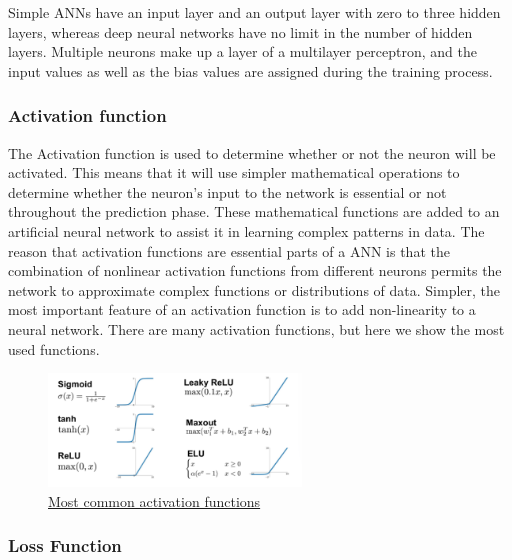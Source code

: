 Simple ANNs have an input layer and an output layer with zero to three hidden layers, whereas deep neural networks have no limit in the number of hidden layers. Multiple neurons make up a layer of a multilayer perceptron, and the input values as well as the bias values are assigned
during the training process.



\subsubsection*{Activation function}
The Activation function is used to determine whether or not the neuron will be activated. This means that it will use simpler mathematical operations to determine whether the neuron's input to the network is essential or not throughout the prediction phase. These mathematical functions are added to an artificial neural network to assist it in learning complex patterns in data. The reason that activation functions are essential parts of a ANN is that the combination of nonlinear activation functions from different neurons permits the network to approximate complex functions or distributions of data. Simpler, the most important feature of an activation function is to add non-linearity to a neural network. There are many activation functions, but here we show the most used functions.

 \begin{figure}[h]
	\centering
	\includegraphics[width=0.6\textwidth]{figures/background/ActivationFunctions.png}
	\captionsetup{labelformat=empty}
	\caption{\href{https://datasciencepreparation.com/blog/articles/what-is-an-activation-function-what-are-commonly-used-activation-functions/}
	{Most common activation functions}}
\end{figure}

\pagebreak

\subsubsection*{Loss Function}

